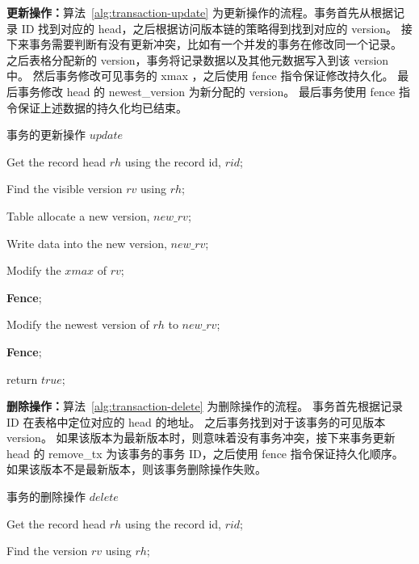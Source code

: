 \textbf{更新操作：}算法~\ref{alg:transaction-update} 为更新操作的流程。事务首先从根据记录 ID 找到对应的 head，之后根据访问版本链的策略得到找到对应的 version。
接下来事务需要判断有没有更新冲突，比如有一个并发的事务在修改同一个记录。
之后表格分配新的 version，事务将记录数据以及其他元数据写入到该 version 中。
然后事务修改可见事务的 xmax ，之后使用 fence 指令保证修改持久化。
最后事务修改 head 的 newest\_version 为新分配的 version。
最后事务使用 fence 指令保证上述数据的持久化均已结束。

\begin{algorithm}[h]
    \caption{事务的更新操作 $update$}
    \label{alg:transaction-update}
    \BlankLine
    Get the record head $rh$ using the record id, $rid$;

    Find the visible version $rv$ using $rh$;


    Table allocate a new version, $new\_rv$;

    Write data into the new version, $new\_rv$;

    Modify the $xmax$ of $rv$;

    \textbf{Fence};

    Modify the newest version of $rh$ to $new\_rv$;

    \textbf{Fence};

    return $true$;

\end{algorithm}


\textbf{删除操作：}算法~\ref{alg:transaction-delete} 为删除操作的流程。
事务首先根据记录 ID 在表格中定位对应的 head 的地址。
之后事务找到对于该事务的可见版本 version。
如果该版本为最新版本时，则意味着没有事务冲突，接下来事务更新 head 的 remove\_tx 为该事务的事务 ID，之后使用 fence 指令保证持久化顺序。
如果该版本不是最新版本，则该事务删除操作失败。

\begin{algorithm}[h]
    \caption{事务的删除操作 $delete$}
    \label{alg:transaction-delete}
    \BlankLine
    Get the record head $rh$ using the record id, $rid$;

    Find the version $rv$ using $rh$;


\end{algorithm}

